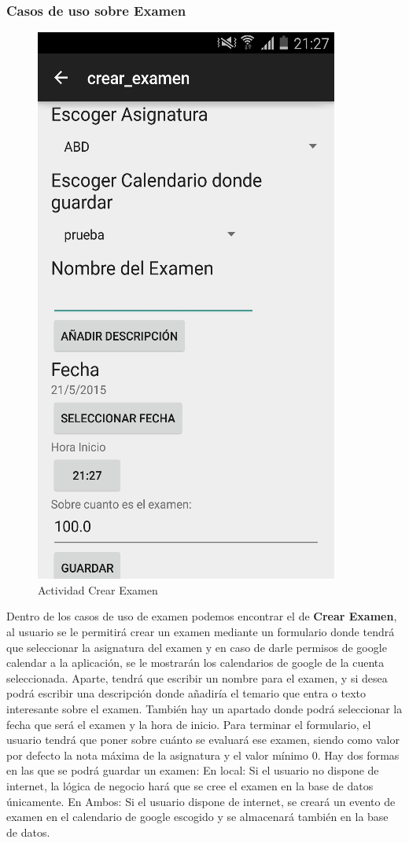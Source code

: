 \subsubsection{Casos de uso sobre Examen}
\label{subsubsecc:Casos de uso sobre Examen}
\begin{figure} 
  \begin{center}
    \includegraphics{figs/crearExamen.png}
  \end{center}
  \caption{Actividad Crear Examen}
\end{figure}
Dentro de los casos de uso de examen podemos encontrar el de \textbf{Crear Examen}, al usuario se le permitirá crear un examen mediante un formulario donde tendrá que seleccionar la asignatura del examen y en caso de darle permisos de google calendar a la aplicación, se le mostrarán los calendarios de google de la cuenta seleccionada.
Aparte, tendrá que escribir un nombre para el examen,  y si desea podrá escribir una descripción donde añadiría el temario que entra o texto interesante sobre el examen.
También hay un apartado donde podrá seleccionar la fecha que será el examen y la hora de inicio.
Para terminar el formulario, el usuario tendrá que poner sobre cuánto se evaluará ese examen, siendo como valor por defecto la nota máxima de la asignatura y el valor mínimo 0.
Hay dos formas en las que se podrá guardar un examen:
En local: Si el usuario no dispone de internet, la lógica de negocio hará que se cree el examen en la base de datos únicamente.
En Ambos: Si el usuario dispone de internet, se creará un evento de examen en el calendario de google escogido  y se almacenará también en la base de datos.


